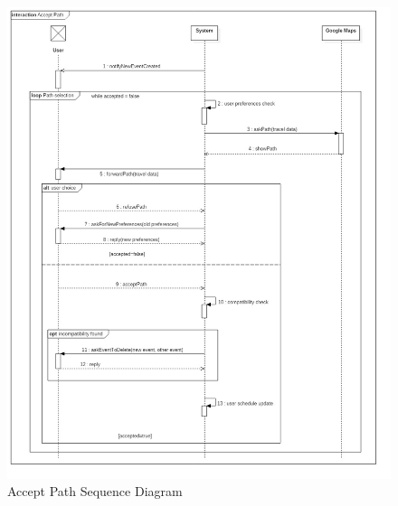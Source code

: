 \documentclass{article}
\begin{document}
\begin{figure}[H]
\includegraphics[width=\linewidth]{Accept_Path.jpg}
\caption{Accept Path Sequence Diagram}
\label{fig:SQ4}
\end{figure}
\end{document}
